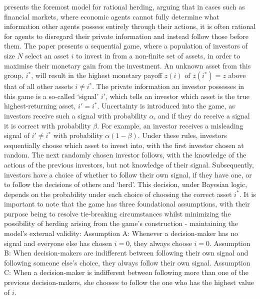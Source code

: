 \documentclass[12pt]{article}
\numberwithin{table}{section}   %
\begin{document}
\citet{banerjee} presents the foremost model for rational herding, arguing that in cases such as financial markets, where economic agents cannot fully determine what information other agents possess entirely through their actions, it is often rational for agents to disregard their private information and instead follow those before them. The paper presents a sequential game, where a population of investors of size $N$ select an asset $i$ to invest in from a non-finite set of assets, in order to maximise their monetary gain from the investment. An unknown asset from this group, $i^*$, will result in the highest monetary payoff $z(i)$ of $z(i^*)=z$ above that of all other assets $i\neq{i^*}$. The private information an investor possesses in this game is a so-called ‘signal’ $i'$, which tells an investor which asset is the true highest-returning asset, $i'=i^*$. Uncertainty is introduced into the game, as investors receive such a signal with probability $\alpha$, and if they do receive a signal it is correct with probability $\beta$. For example, an investor receives a misleading signal of  $i'\neq{i^*}$ with probability $\alpha(1-\beta)$. Under these rules, investors sequentially choose which asset to invest into, with the first investor chosen at random. The next randomly chosen investor follows, with the knowledge of the actions of the previous investors, but not knowledge of their signal. Subsequently, investors have a choice of whether to follow their own signal, if they have one, or to follow the decisions of others and ‘herd’. This decision, under Bayesian logic, depends on the probability under each choice of choosing the correct asset $i^*$. It is important to note that the game has three foundational assumptions, with their purpose being to resolve tie-breaking circumstances whilst minimizing the possibility of herding arising from the game’s construction - maintaining the model’s external validity: Assumption A: Whenever a decision-maker has no signal and everyone else has chosen $i=0$, they always choose $i=0$. Assumption B: When decision-makers are indifferent between following their own signal and following someone else’s choice, they always follow their own signal. Assumption C: When a decision-maker is indifferent between following more than one of the previous decision-makers, she chooses to follow the one who has the highest value of $i$.
\end{document}
